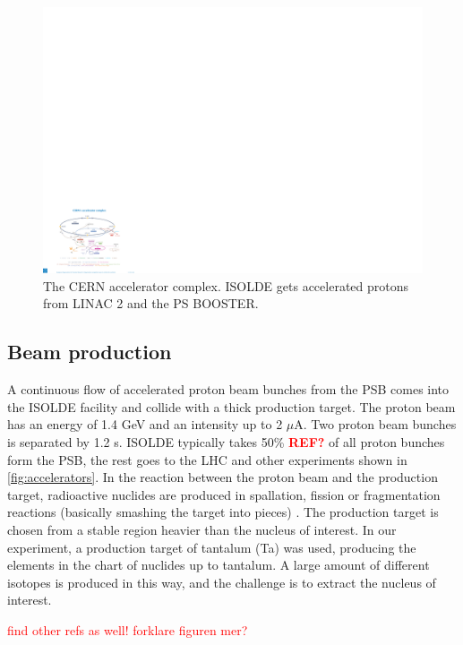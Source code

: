 \documentclass[twoside,english]{uiofysmaster/uiofysmaster}
\let\orgautoref\autoref
\renewcommand{\autoref}
        {\def\equationautorefname{Eq.}%
         \def\figureautorefname{Fig.}%
         \def\subfigureautorefname{Fig.}%
         \def\sectionautorefname{Sec.}%
         \def\subsectionautorefname{Sec.}%
         \def\subsubsectionautorefname{Sec.}%
         \def\Itemautorefname{item}%
         \def\tableautorefname{Tab.}%
         \orgautoref}
\begin{document}
\begin{figure}[t]
	\centering
	\includegraphics[width=\textwidth]{images/0812015.pdf}
	\caption{The CERN accelerator complex. ISOLDE gets accelerated protons from LINAC 2 and the PS BOOSTER.}
	\label{fig:accelerators}
\end{figure}


\subsection{Beam production}
A continuous flow of accelerated proton beam bunches from the PSB comes into the ISOLDE facility and collide with a thick production target. The proton beam has an energy of 1.4 GeV and an intensity up to 2 $\mu$A. Two proton beam bunches is separated by 1.2 s. ISOLDE typically takes 50\% \textcolor{red}{\textbf{REF?}} of all proton bunches form the PSB, the rest goes to the LHC and other experiments shown in \autoref{fig:accelerators}. In the reaction between the proton beam and the production target, radioactive nuclides are produced in spallation, fission or fragmentation reactions (basically smashing the target into pieces) \cite{ISOLDE-web}. The production target is chosen from a stable region heavier than the nucleus of interest. In our experiment, a production target of tantalum (Ta) was used, producing the elements in the chart of nuclides up to tantalum. A large amount of different isotopes is produced in this way, and the challenge is to extract the nucleus of interest. 
 
\textcolor{red}{find other refs as well! forklare figuren mer?}


\bigskip
\end{document}
